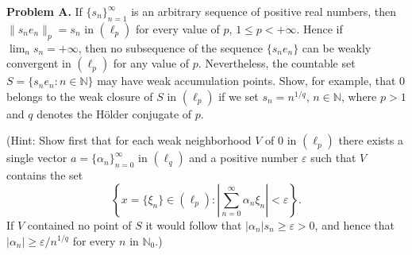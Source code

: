 \textbf{Problem A.} If $\{s_n\}_{n=1}^{\infty}$ is an arbitrary sequence of positive real numbers, then $\|s_n e_n\|_p = s_n$ in $(\ell_p)$ for every value of $p$, $1 \leq p < +\infty$. Hence if $\lim_n s_n = +\infty$, then no subsequence of the sequence $\{s_n e_n\}$ can be weakly convergent in $(\ell_p)$ for any value of $p$. Nevertheless, the countable set $S = \{s_n e_n : n \in \mathbb{N}\}$ may have weak accumulation points. Show, for example, that $0$ belongs to the weak closure of $S$ in $(\ell_p)$ if we set $s_n = n^{1/q}$, $n \in \mathbb{N}$, where $p > 1$ and $q$ denotes the H\"older conjugate of $p$.

(Hint: Show first that for each weak neighborhood $V$ of $0$ in $(\ell_p)$ there exists a single vector $a = \{\alpha_n\}_{n=0}^{\infty}$ in $(\ell_q)$ and a positive number $\varepsilon$ such that $V$ contains the set
$$\left\{x = \{\xi_n\} \in (\ell_p) : \left| \sum_{n=0}^{\infty} \alpha_n \xi_n \right| < \varepsilon \right\}.$$
If $V$ contained no point of $S$ it would follow that $|\alpha_n| s_n \geq \varepsilon > 0$, and hence that $|\alpha_n| \geq \varepsilon/n^{1/q}$ for every $n$ in $\mathbb{N}_0$.)
